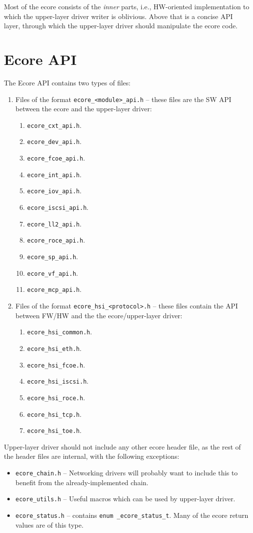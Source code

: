 \documentclass[11pt,fleqn,hidelinks,oneside]{book} %
\begin{document}
Most of the ecore consists of the \textit{inner} parts, i.e., HW-oriented implementation to which the upper-layer driver writer is oblivious.
Above that is a concise API layer, through which the upper-layer driver should manipulate the ecore code.

\section{Ecore API}
\label{sec:overview-api}
The Ecore API contains two types of files:
\begin{enumerate}
	\item Files of the format \texttt{ecore\_<module>\_api.h} -- these files are the SW API between the ecore and the upper-layer driver:
	\begin{enumerate}
		\item \texttt{ecore\_cxt\_api.h}.
		\item \texttt{ecore\_dev\_api.h}.
		\item \texttt{ecore\_fcoe\_api.h}.
		\item \texttt{ecore\_int\_api.h}.
		\item \texttt{ecore\_iov\_api.h}.
		\item \texttt{ecore\_iscsi\_api.h}.
		\item \texttt{ecore\_ll2\_api.h}.
		\item \texttt{ecore\_roce\_api.h}.
		\item \texttt{ecore\_sp\_api.h}.
		\item \texttt{ecore\_vf\_api.h}.
		\item \texttt{ecore\_mcp\_api.h}.
	\end{enumerate}
	\item Files of the format \texttt{ecore\_hsi\_<protocol>.h} -- these files contain the API between FW/HW and the the ecore/upper-layer driver:
	\begin{enumerate}
		\item \texttt{ecore\_hsi\_common.h}.
		\item \texttt{ecore\_hsi\_eth.h}.
		\item \texttt{ecore\_hsi\_fcoe.h}.
		\item \texttt{ecore\_hsi\_iscsi.h}.
		\item \texttt{ecore\_hsi\_roce.h}.
		\item \texttt{ecore\_hsi\_tcp.h}.
		\item \texttt{ecore\_hsi\_toe.h}.
	\end{enumerate}
\end{enumerate}
Upper-layer driver should not include any other ecore header file, as the rest of the header files are internal, with the following exceptions:
\begin{itemize}
	\item \texttt{ecore\_chain.h} -- Networking drivers will probably want to include this to benefit from the already-implemented chain.
	\item \texttt{ecore\_utils.h} -- Useful macros which can be used by upper-layer driver.
	\item \texttt{ecore\_status.h} -- contains \texttt{enum \_ecore\_status\_t}. Many of the ecore return values are of this type.
\end{itemize}
\end{document}
